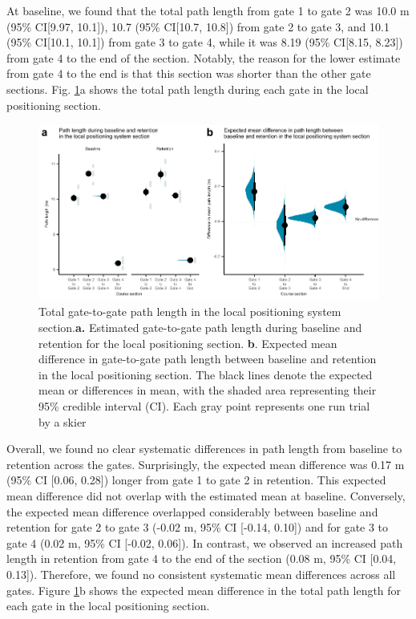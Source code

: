 \documentclass{article}
\begin{document}

At baseline, we found that the total path length from gate 1 to gate 2 was 10.0 m (95\% CI[9.97,  10.1]), 10.7 (95\% CI[10.7, 10.8]) from gate 2 to gate 3, and 10.1 (95\% CI[10.1, 10.1]) from gate 3 to gate 4, while it was 8.19 (95\% CI[8.15, 8.23]) from gate 4 to the end of the section. Notably, the reason for the lower estimate from gate 4 to the end is that this section was shorter than the other gate sections. Fig. \ref{fig: path}a shows the total path length during each gate in the local positioning section.


\begin{figure}[H]
    \centering
    \includegraphics[width=1\linewidth]{figurer/figure_path4.pdf}
    \caption{Total gate-to-gate path length in the local positioning system section.\textbf{a.} Estimated gate-to-gate path length during baseline and retention for the local positioning section. \textbf{b}. Expected mean difference in gate-to-gate path length between baseline and retention in the local positioning section. The black lines denote the expected mean or differences in mean, with the shaded area representing their 95\% credible interval (CI). Each gray point represents one run trial by a skier}
    \label{fig: path}
\end{figure}

Overall, we found no clear systematic differences in path length from baseline to retention across the gates. Surprisingly, the expected mean difference was 0.17 m (95\% CI [0.06, 0.28]) longer from gate 1 to gate 2 in retention. This expected mean difference did not overlap with the estimated mean at baseline. Conversely, the expected mean difference overlapped considerably between baseline and retention for gate 2 to gate 3 (-0.02 m, 95\% CI [-0.14, 0.10]) and for gate 3 to gate 4 (0.02 m, 95\% CI [-0.02, 0.06]). In contrast, we observed an increased path length in retention from gate 4 to the end of the section (0.08 m, 95\% CI [0.04, 0.13]). Therefore, we found no consistent systematic mean differences across all gates. Figure \ref{fig: path}b shows the expected mean difference in the total path length for each gate in the local positioning section. 
\end{document}
